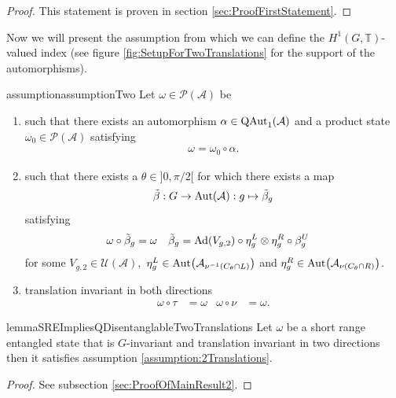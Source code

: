 \documentclass[12pt,a4paper,twoside]{article}
\let\originalleft\left
\let\originalright\right
\renewcommand{\left}{\mathopen{}\mathclose\bgroup\originalleft}
\renewcommand{\right}{\aftergroup\egroup\originalright}
\newcommand{\UU}{\mathcal U}
\newcommand{\PP}{\mathcal P}
\newcommand{\TT}{\mathbb T}
\renewcommand{\AA}{\mathcal A}
\newcommand{\Ad}[1]{\textrm{Ad}\left(#1\right)}
\newcommand{\Aut}[1]{\textrm{Aut}\left(#1\right)}
\newcommand{\QAut}[1]{\textrm{QAut}_1\left(#1\right)}
\theoremstyle{definition}
\numberwithin{equation}{section}
\begin{document}
\begin{proof}
	This statement is proven in section \ref{sec:ProofFirstStatement}.
\end{proof}

Now we will present the assumption from which we can define the $H^1(G,\TT)$-valued index (see figure \ref{fig:SetupForTwoTranslations} for the support of the automorphisms).
\begin{restatable}{assumption}{assumptionTwo}\label{assumption:2Translations}
	Let $\omega\in\PP(\AA)$ be
	\begin{enumerate}
		\item such that there exists an automorphism $\alpha\in\QAut{\AA}$ and a product state $\omega_0\in\PP(\AA)$ satisfying
		\begin{align}
			\omega=\omega_0\circ\alpha.
		\end{align}
		\item such that there exists a $\theta\in]0,\pi/2[$ for which there exists a map
		\begin{equation}
			\tilde\beta:G\rightarrow\Aut{\AA}:g\mapsto\tilde\beta_g
		\end{equation}
		satisfying
		\begin{align}
			\label{eq:2TranslationsCondition3part1}
			\omega\circ\tilde\beta_g&=\omega&\tilde\beta_g&=\Ad{V_{g,2}}\circ\eta^L_g\otimes\eta^R_g\circ\beta^U_g
		\end{align}
		for some $V_{g,2}\in\UU(\AA),$ $\eta^L_g\in\Aut{\AA_{\nu^{-1}(C_\theta\cap L)}}$ and  $\eta^R_g\in\Aut{\AA_{\nu(C_\theta\cap R)}}$.
		\item translation invariant in both directions
		\begin{align}
			\omega\circ\tau&=\omega&\omega\circ\nu&=\omega.
		\end{align}
	\end{enumerate}
\end{restatable}
\begin{restatable}{lemma}{SREImpliesQDisentanglableTwoTranslations}\label{lem:SRE_Implies_QDisentanglable_TwoTranslations}
	Let $\omega$ be a short range entangled state that is $G$-invariant and translation invariant in two directions then it satisfies assumption \ref{assumption:2Translations}.
\end{restatable}
\begin{proof}
	See subsection \ref{sec:ProofOfMainResult2}.
\end{proof}
\end{document}
